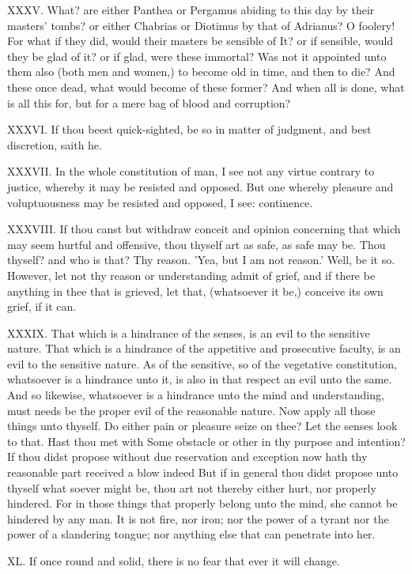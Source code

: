 XXXV. What? are either Panthea or Pergamus abiding to this day by their
masters' tombs? or either Chabrias or Diotimus by that of Adrianus? O
foolery! For what if they did, would their masters be sensible of It? or
if sensible, would they be glad of it? or if glad, were these immortal?
Was not it appointed unto them also (both men and women,) to become old in
time, and then to die? And these once dead, what would become of these
former? And when all is done, what is all this for, but for a mere bag of
blood and corruption?

XXXVI. If thou beest quick-sighted, be so in matter of judgment, and
best discretion, saith he.

XXXVII. In the whole constitution of man, I see not any virtue contrary
to justice, whereby it may be resisted and opposed. But one whereby
pleasure and voluptuousness may be resisted and opposed, I see:
continence.

XXXVIII. If thou canst but withdraw conceit and opinion concerning that
which may seem hurtful and offensive, thou thyself art as safe, as safe
may be. Thou thyself? and who is that? Thy reason. 'Yea, but I am not
reason.' Well, be it so. However, let not thy reason or understanding
admit of grief, and if there be anything in thee that is grieved, let
that, (whatsoever it be,) conceive its own grief, if it can.

XXXIX. That which is a hindrance of the senses, is an evil to the
sensitive nature. That which is a hindrance of the appetitive and
prosecutive faculty, is an evil to the sensitive nature. As of the
sensitive, so of the vegetative constitution, whatsoever is a hindrance
unto it, is also in that respect an evil unto the same. And so likewise,
whatsoever is a hindrance unto the mind and understanding, must needs be
the proper evil of the reasonable nature. Now apply all those things unto
thyself. Do either pain or pleasure seize on thee? Let the senses look to
that. Hast thou met with Some obstacle or other in thy purpose and
intention? If thou didst propose without due reservation and exception now
hath thy reasonable part received a blow indeed But if in general thou
didst propose unto thyself what soever might be, thou art not thereby
either hurt, nor properly hindered. For in those things that properly
belong unto the mind, she cannot be hindered by any man. It is not fire,
nor iron; nor the power of a tyrant nor the power of a slandering tongue;
nor anything else that can penetrate into her.

XL. If once round and solid, there is no fear that ever it will change.

